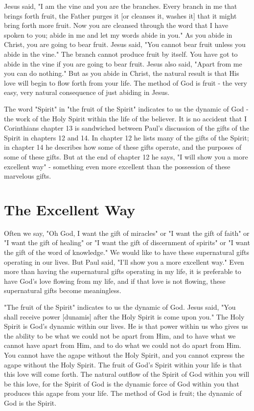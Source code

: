 Jesus said, "I am the vine and you are the branches. Every branch in me that brings forth fruit, the Father purges it [or cleanses it, washes it] that it might bring forth more fruit. Now you are cleansed through the word that I have spoken to you; abide in me and let my words abide in you." As you abide in Christ, you are going to bear fruit. Jesus said, "You cannot bear fruit unless you abide in the vine." The branch cannot produce fruit by itself. You have got to abide in the vine if you are going to bear fruit. Jesus also said, "Apart from me you can do nothing." But as you abide in Christ, the natural result is that His love will begin to flow forth from your life. The method of God is fruit - the very easy, very natural consequence of just abiding in Jesus. 

The word "Spirit" in "the fruit of the Spirit" indicates to us the dynamic of God - the work of the Holy Spirit within the life of the believer. It is no accident that I Corinthians chapter 13 is sandwiched between Paul's discussion of the gifts of the Spirit in chapters 12 and 14. In chapter 12 he lists many of the gifts of the Spirit; in chapter 14 he describes how some of these gifts operate, and the purposes of some of these gifts. But at the end of chapter 12 he says, "I will show you a more excellent way" - something even more excellent than the possession of these marvelous gifts. 

\section*{The Excellent Way}

Often we say, "Oh God, I want the gift of miracles" or "I want the gift of faith" or "I want the gift of healing" or "I want the gift of discernment of spirits" or "I want the gift of the word of knowledge." We would like to have these supernatural gifts operating in our lives. But Paul said, "I'll show you a more excellent way." Even more than having the supernatural gifts operating in my life, it is preferable to have God's love flowing from my life, and if that love is not flowing, these supernatural gifts become meaningless. 

"The fruit of the Spirit" indicates to us the dynamic of God. Jesus said, "You shall receive power [dunamis] after the Holy Spirit is come upon you." The Holy Spirit is God's dynamic within our lives. He is that power within us who gives us the ability to be what we could not be apart from Him, and to have what we cannot have apart from Him, and to do what we could not do apart from Him. You cannot have the agape without the Holy Spirit, and you cannot express the agape without the Holy Spirit. The fruit of God's Spirit within your life is that this love will come forth. The natural outflow of the Spirit of God within you will be this love, for the Spirit of God is the dynamic force of God within you that produces this agape from your life. The method of God is fruit; the dynamic of God is the Spirit. 

